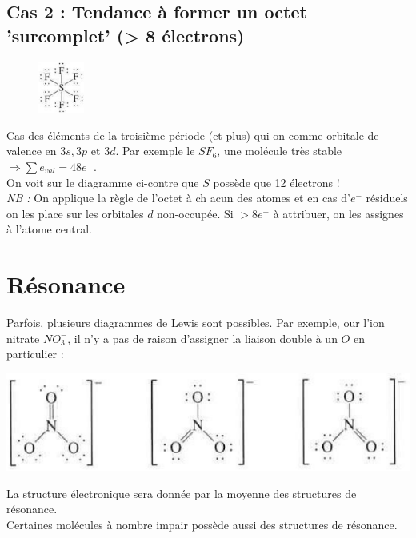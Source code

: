 \documentclass	[11pt, a4paper, openany]{book}
\begin{document}
\subsection{Cas 2 :  Tendance à former un octet 'surcomplet' (> 8 électrons)}
\begin{figure}
	\includegraphics[width=1.5cm]{image9.png}
\end{figure}
Cas des éléments de la troisième période (et plus) qui on comme orbitale de valence en $3s, 3p$ et $3d$. Par exemple le $SF_6$, une molécule très stable\\
$\Rightarrow \sum e^-_{val} = 48 e^-$.\\
On voit sur le diagramme ci-contre que $S$ possède que 12 électrons !\\

\textit{NB :} On applique la règle de l'octet à ch acun des atomes et en cas d'$e^-$ résiduels on les place sur les orbitales $d$ non-occupée. Si $> 8 e^-$ à attribuer, on les assignes à l'atome central.
\newpage
\section{Résonance}
Parfois, plusieurs diagrammes de Lewis sont possibles. Par exemple, our l'ion nitrate $NO_3^-$, il  n'y a pas de raison d'assigner la liaison double à un $O$ en particulier :
\begin{center}
	\includegraphics[scale=0.55]{image10.png}\\
\end{center}
La structure électronique sera donnée par la moyenne des structures de résonance.\\
Certaines molécules à nombre impair possède aussi des structures de résonance.\\
\end{document}
